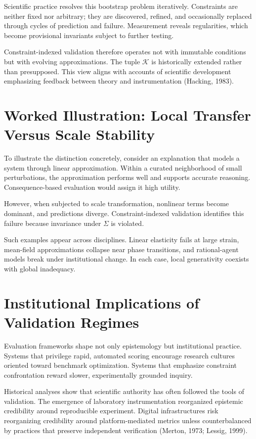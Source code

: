 \documentclass[11pt]{article}
\begin{document}
Scientific practice resolves this bootstrap problem iteratively. Constraints are neither fixed nor arbitrary; they are discovered, refined, and occasionally replaced through cycles of prediction and failure. Measurement reveals regularities, which become provisional invariants subject to further testing.

Constraint-indexed validation therefore operates not with immutable conditions but with evolving approximations. The tuple \(\mathcal{K}\) is historically extended rather than presupposed. This view aligns with accounts of scientific development emphasizing feedback between theory and instrumentation (Hacking, 1983).

\section{Worked Illustration: Local Transfer Versus Scale Stability}

To illustrate the distinction concretely, consider an explanation that models a system through linear approximation. Within a curated neighborhood of small perturbations, the approximation performs well and supports accurate reasoning. Consequence-based evaluation would assign it high utility.

However, when subjected to scale transformation, nonlinear terms become dominant, and predictions diverge. Constraint-indexed validation identifies this failure because invariance under \(\Sigma\) is violated.

Such examples appear across disciplines. Linear elasticity fails at large strain, mean-field approximations collapse near phase transitions, and rational-agent models break under institutional change. In each case, local generativity coexists with global inadequacy.

\section{Institutional Implications of Validation Regimes}

Evaluation frameworks shape not only epistemology but institutional practice. Systems that privilege rapid, automated scoring encourage research cultures oriented toward benchmark optimization. Systems that emphasize constraint confrontation reward slower, experimentally grounded inquiry.

Historical analyses show that scientific authority has often followed the tools of validation. The emergence of laboratory instrumentation reorganized epistemic credibility around reproducible experiment. Digital infrastructures risk reorganizing credibility around platform-mediated metrics unless counterbalanced by practices that preserve independent verification (Merton, 1973; Lessig, 1999).
\end{document}
